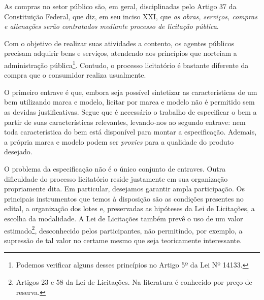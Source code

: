 

\label{cap:introducao}

\enlargethispage{.5\baselineskip}



As compras no setor público são, em geral, disciplinadas pelo Artigo 37 da Constituição Federal, que diz, em seu inciso XXI, que \emph{as obras, serviços, compras e alienações serão contratados mediante processo de licitação pública}.

Com o objetivo de realizar suas atividades a contento, os agentes públicos precisam adquirir bens e serviços, atendendo aos princípios que norteiam a administração pública\footnote{Podemos verificar alguns desses princípios no Artigo 5º da Lei Nº 14133.}. Contudo, o processo licitatório é bastante diferente da compra que o consumidor realiza usualmente.

O primeiro entrave é que, embora seja possível sintetizar as características de um bem utilizando marca e modelo, licitar por marca e modelo não é permitido sem as devidas justificativas. Segue que é necessário o trabalho de especificar o bem a partir de suas características relevantes, levando-nos ao segundo entrave: nem toda característica do bem está disponível para montar a especificação. Ademais, a própria marca e modelo podem ser \emph{proxies} para a qualidade do produto desejado.

O problema da especificação não é o único conjunto de entraves. Outra dificuldade do processo licitatório reside justamente em sua organização propriamente dita. Em particular, desejamos garantir ampla participação. Os principais instrumentos que temos à disposição são as condições presentes no edital, a organização dos lotes e, preservadas as hipóteses da Lei de Licitações, a escolha da modalidade. A Lei de Licitações também prevê o uso de um valor estimado\footnote{Artigos 23 e 58 da Lei de Licitações. Na literatura é conhecido por preço de reserva.}, desconhecido pelos participantes, não permitindo, por exemplo, a supressão de tal valor no certame mesmo que seja teoricamente interessante.

